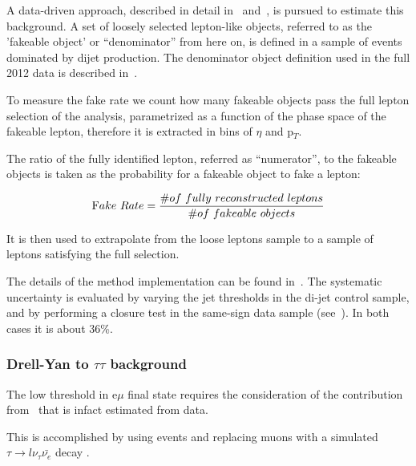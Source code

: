 A data-driven approach, described in detail in~\cite{AN-2010-261} and~\cite{AN-2010-397}, is pursued 
to estimate this background. A set of loosely selected lepton-like objects, referred to as the 
'fakeable object' or ``denominator'' from here on, is defined in a sample of events 
dominated by dijet production. The denominator object definition used in the full 2012
data is described in~\cite{AN-2012-378}.

To measure the fake rate we count how many fakeable objects pass the full lepton selection 
of the analysis, parametrized as a function of the phase space of the fakeable lepton, therefore 
it is extracted in bins of $\eta$ and p$_T$.


The ratio of the fully identified lepton, referred as ``numerator'', to the 
fakeable objects is taken as the probability for a fakeable object to fake a lepton:

\begin{equation} 
{\mbox Fake\ Rate } = \frac{\# of \ fully \ reconstructed \ leptons}{\# of \ fakeable \ objects} 
\end{equation}

It is then used to extrapolate from the loose leptons sample to a sample of leptons satisfying the  
full selection. 

The details of the method implementation can be found in~\cite{AN-2013-022}.
The systematic uncertainty is evaluated by varying the jet thresholds in the di-jet control sample, and by
performing a closure test in the same-sign data sample (see~\cite{AN-2013-022}). In both cases it is about 36\%.

	\subsubsection{Drell-Yan to \texorpdfstring{$\tau\tau$}{tau tau} background\label{sec:DYtautaubkg}}


The low \MET threshold in e$\mu$ final state
requires the consideration of the contribution from 
\dytt\, that is infact estimated from data.

This is accomplished by using 
\dymm events and replacing muons with a simulated
$\tau\to l\nu_\tau\bar{\nu_e}$ decay \cite{AN-2011-020}.\\
 
